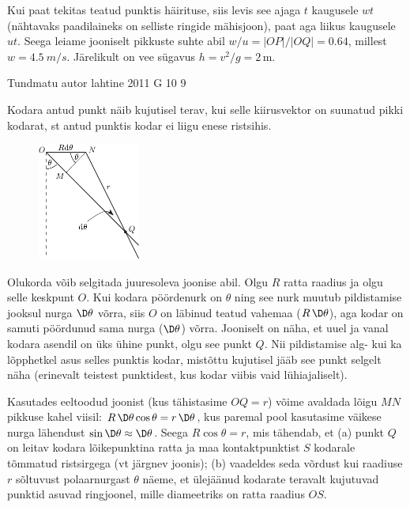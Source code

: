 \documentclass[11pt, twoside]{article}
\begin{document}
{{\osa
Kui paat tekitas teatud punktis häirituse, siis levis see ajaga $t$ kaugusele $wt$ (nähtavaks paadilaineks on selliste ringide mähisjoon),
paat aga liikus kaugusele $ut$. Seega leiame jooniselt pikkuste suhte abil $w/u=|OP|/|OQ|=\num{0.64}$, millest $w=\SI{4.5}{m/s}$. Järelikult on vee sügavus
$h=v^2/g=2\,$m.
\fi
}

{Tundmatu autor} %
{lahtine} %
{2011} %
{G 10} %
{9} %
{

\ifSolution
Kodara antud punkt näib kujutisel terav, kui selle kiirusvektor on suunatud pikki kodarat, st antud punktis kodar ei liigu enese ristsihis.

\begin{figure}
	\vspace*{-15pt}
	\includegraphics[width=0.3\textwidth]{2011-lahg-10-kodar_a}
	\vspace*{-25pt}
\end{figure}

Olukorda võib selgitada juuresoleva joonise abil.
Olgu $R$ ratta raadius ja olgu selle keskpunt $O$. Kui kodara pöördenurk on $\theta$ ning see nurk muutub pildistamise jooksul nurga $\D\theta$ võrra,
siis $O$ on läbinud teatud vahemaa ($R \, \D\theta$), aga kodar on samuti pöördunud sama nurga ($\D \theta$) võrra.
Jooniselt on näha, et uuel ja vanal kodara asendil on üks ühine punkt, olgu see punkt $Q$. Nii pildistamise alg- kui ka lõpphetkel asus selles punktis kodar, mistõttu kujutisel jääb see punkt selgelt näha (erinevalt teistest punktidest, kus kodar viibis vaid lühiajaliselt).

Kasutades eeltoodud joonist (kus tähistasime $OQ = r$) võime avaldada lõigu $MN$
pikkuse kahel viisil: $R \,\D \theta \cos \theta = r \,\D \theta$, kus
paremal pool kasutasime väikese nurga lähendust $\sin \D\theta\approx \D\theta$. Seega $R \cos \theta = r$, mis tähendab, et
(a) punkt $Q$ on leitav kodara lõikepunktina ratta ja maa kontaktpunktist $S$ kodarale tõmmatud ristsirgega (vt järgnev joonis);
(b) vaadeldes seda võrdust kui raadiuse $r$ sõltuvust polaarnurgast $\theta$ näeme, et ülejäänud kodarate teravalt kujutuvad punktid asuvad ringjoonel,
mille diameetriks on ratta raadius $OS$.

}}
\end{document}
